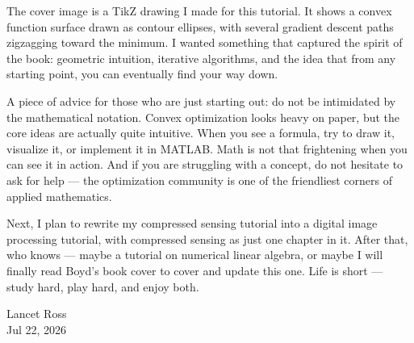 \documentclass[lang=en,color=blue,mode=fancy,titlestyle=hang]{elegantbook}
\begin{document}
The cover image is a TikZ drawing I made for this tutorial. It shows a convex function surface
drawn as contour ellipses, with several gradient descent paths zigzagging toward the minimum.
I wanted something that captured the spirit of the book: geometric intuition, iterative algorithms,
and the idea that from any starting point, you can eventually find your way down.

A piece of advice for those who are just starting out: do not be intimidated by the mathematical
notation. Convex optimization looks heavy on paper, but the core ideas are actually quite intuitive.
When you see a formula, try to draw it, visualize it, or implement it in MATLAB. Math is not that
frightening when you can see it in action. And if you are struggling with a concept, do not hesitate
to ask for help — the optimization community is one of the friendliest corners of applied mathematics.

Next, I plan to rewrite my compressed sensing tutorial into a digital image processing tutorial,
with compressed sensing as just one chapter in it. After that, who knows — maybe a tutorial on
numerical linear algebra, or maybe I will finally read Boyd's book cover to cover and update this
one. Life is short — study hard, play hard, and enjoy both.

\begin{flushright}
  Lancet Ross\\
  Jul 22, 2026
\end{flushright}
\end{document}
